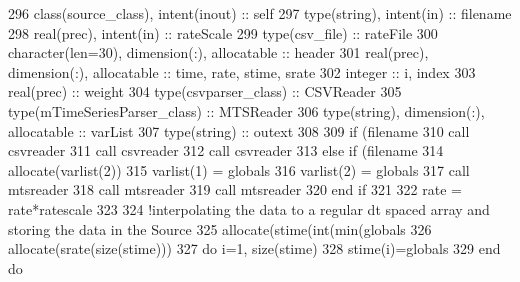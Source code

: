 \begin{DoxyCode}
296     \textcolor{keywordtype}{class}(source\_class), \textcolor{keywordtype}{intent(inout)} :: self
297     \textcolor{keywordtype}{type}(string), \textcolor{keywordtype}{intent(in)} :: filename
298     \textcolor{keywordtype}{real(prec)}, \textcolor{keywordtype}{intent(in)} :: rateScale
299     \textcolor{keywordtype}{type}(csv\_file) :: rateFile
300     \textcolor{keywordtype}{character(len=30)}, \textcolor{keywordtype}{dimension(:)}, \textcolor{keywordtype}{allocatable} :: header
301     \textcolor{keywordtype}{real(prec)}, \textcolor{keywordtype}{dimension(:)}, \textcolor{keywordtype}{allocatable} :: time, rate, stime, srate
302     \textcolor{keywordtype}{integer} :: i, index
303     \textcolor{keywordtype}{real(prec)} :: weight
304     \textcolor{keywordtype}{type}(csvparser\_class) :: CSVReader
305     \textcolor{keywordtype}{type}(mTimeSeriesParser\_class) :: MTSReader
306     \textcolor{keywordtype}{type}(string), \textcolor{keywordtype}{dimension(:)}, \textcolor{keywordtype}{allocatable} :: varList
307     \textcolor{keywordtype}{type}(string) :: outext
308 
309     \textcolor{keywordflow}{if} (filename%
310         \textcolor{keyword}{call }csvreader%
311         \textcolor{keyword}{call }csvreader%
312         \textcolor{keyword}{call }csvreader%
313     \textcolor{keywordflow}{else} \textcolor{keywordflow}{if} (filename%
314         \textcolor{keyword}{allocate}(varlist(2))
315         varlist(1) = globals%
316         varlist(2) = globals%
317         \textcolor{keyword}{call }mtsreader%
318         \textcolor{keyword}{call }mtsreader%
319         \textcolor{keyword}{call }mtsreader%
320 \textcolor{keywordflow}{    end if}
321     
322     rate = rate*ratescale
323     
324     \textcolor{comment}{!interpolating the data to a regular dt spaced array and storing the data in the Source}
325     \textcolor{keyword}{allocate}(stime(int(min(globals%
326     \textcolor{keyword}{allocate}(srate(\textcolor{keyword}{size}(stime)))
327     \textcolor{keywordflow}{do} i=1, \textcolor{keyword}{size}(stime)
328         stime(i)=globals%
329 \textcolor{keywordflow}{    end do}

\end{DoxyCode}

